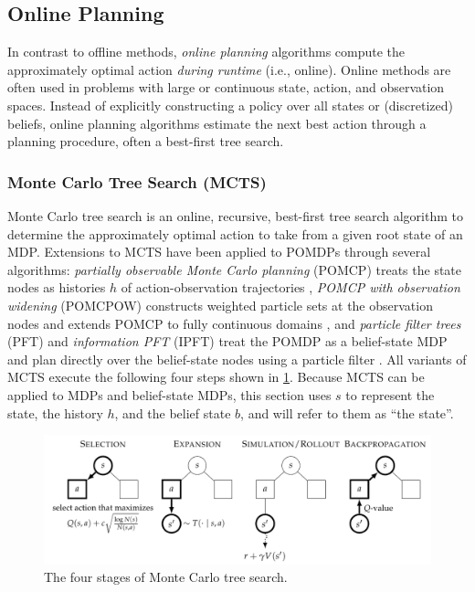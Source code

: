\subsection{Online Planning}
In contrast to offline methods, \textit{online planning} algorithms compute the approximately optimal action \textit{during runtime} (i.e., online).
Online methods are often used in problems with large or continuous state, action, and observation spaces.
Instead of explicitly constructing a policy over all states or (discretized) beliefs, online planning algorithms estimate the next best action through a planning procedure, often a best-first tree search.

\subsubsection{Monte Carlo Tree Search (MCTS)}\label{sec:mcts}
Monte Carlo tree search \cite{coulom2007efficient,browne2012survey} is an online, recursive, best-first tree search algorithm to determine the approximately optimal action to take from a given root state of an MDP.
Extensions to MCTS have been applied to POMDPs through several algorithms: \textit{partially observable Monte Carlo planning} (POMCP) treats the state nodes as histories $h$ of action-observation trajectories \cite{silver2010pomcp}, \textit{POMCP with observation widening} (POMCPOW) constructs weighted particle sets at the observation nodes and extends POMCP to fully continuous domains \cite{sunberg2018online}, and \textit{particle filter trees} (PFT) and \textit{information PFT} (IPFT) treat the POMDP as a belief-state MDP and plan directly over the belief-state nodes using a particle filter \cite{sunberg2018online,fischer2020information}.
All variants of MCTS execute the following four steps shown in \cref{fig:background-mcts}.
Because MCTS can be applied to MDPs and belief-state MDPs, this section uses $s$ to represent the state, the history $h$, and the belief state $b$, and will refer to them as ``the state''.


\begin{figure}[t]
    \centering
    \includegraphics[width=\linewidth]{diagrams/background/mcts.pdf}
    \caption{The four stages of Monte Carlo tree search.}
    \label{fig:background-mcts}
\end{figure}


